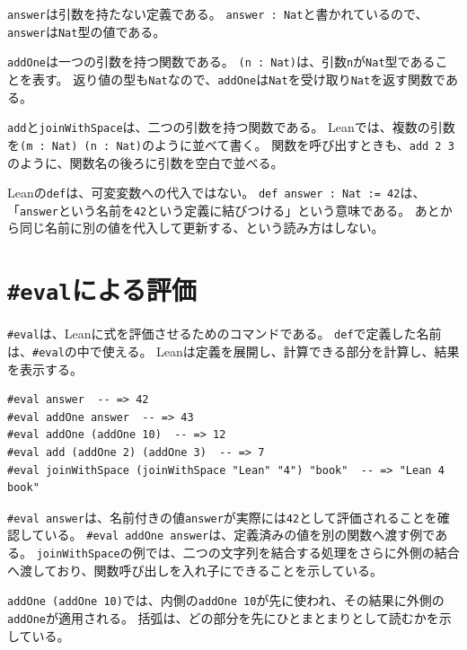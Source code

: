 \texttt{answer}は引数を持たない定義である。
\texttt{answer : Nat}と書かれているので、\texttt{answer}は\texttt{Nat}型の値である。

\texttt{addOne}は一つの引数を持つ関数である。
\texttt{(n : Nat)}は、引数\texttt{n}が\texttt{Nat}型であることを表す。
返り値の型も\texttt{Nat}なので、\texttt{addOne}は\texttt{Nat}を受け取り\texttt{Nat}を返す関数である。

\texttt{add}と\texttt{joinWithSpace}は、二つの引数を持つ関数である。
Leanでは、複数の引数を\texttt{(m : Nat) (n : Nat)}のように並べて書く。
関数を呼び出すときも、\texttt{add 2 3}のように、関数名の後ろに引数を空白で並べる。

\begin{warningbox}
Leanの\texttt{def}は、可変変数への代入ではない。
\texttt{def answer : Nat := 42}は、「\texttt{answer}という名前を\texttt{42}という定義に結びつける」という意味である。
あとから同じ名前に別の値を代入して更新する、という読み方はしない。
\end{warningbox}

\section{\texttt{\#eval}による評価}

\texttt{\#eval}は、Leanに式を評価させるためのコマンドである。
\texttt{def}で定義した名前は、\texttt{\#eval}の中で使える。
Leanは定義を展開し、計算できる部分を計算し、結果を表示する。

\begin{listing}[htbp]
\begin{verbatim}
#eval answer  -- => 42
#eval addOne answer  -- => 43
#eval addOne (addOne 10)  -- => 12
#eval add (addOne 2) (addOne 3)  -- => 7
#eval joinWithSpace (joinWithSpace "Lean" "4") "book"  -- => "Lean 4 book"
\end{verbatim}
\caption{定義を使った評価}
\label{lst:ch01-eval-basics}
\end{listing}

\texttt{\#eval answer}は、名前付きの値\texttt{answer}が実際には\texttt{42}として評価されることを確認している。
\texttt{\#eval addOne answer}は、定義済みの値を別の関数へ渡す例である。
\texttt{joinWithSpace}の例では、二つの文字列を結合する処理をさらに外側の結合へ渡しており、関数呼び出しを入れ子にできることを示している。

\texttt{addOne (addOne 10)}では、内側の\texttt{addOne 10}が先に使われ、その結果に外側の\texttt{addOne}が適用される。
括弧は、どの部分を先にひとまとまりとして読むかを示している。

